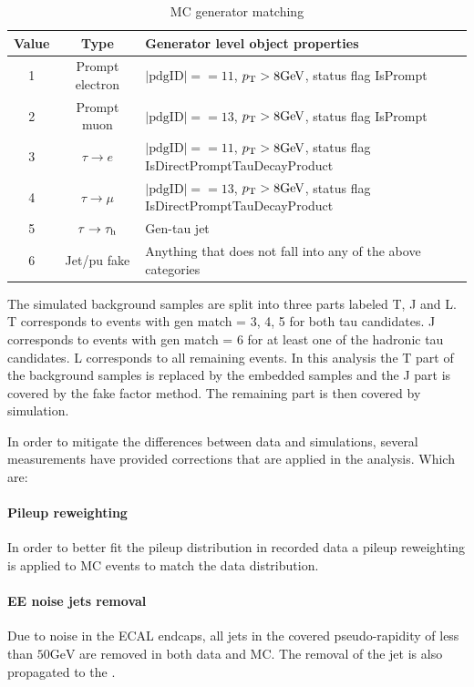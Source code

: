 \begin{table}[]
    \centering
    \begin{tabular}{|c|c|l|}
        \hline
        Value & Type & Generator level object properties \\
        \hline
        1 & Prompt electron & $|\mathrm{pdgID}|==11$, $p_{\mathrm{T}} > 8 \mathrm{GeV}$, status flag IsPrompt\\
        \hline
        2 & Prompt muon & $|\mathrm{pdgID}|==13$, $p_{\mathrm{T}} > 8 \mathrm{GeV}$, status flag IsPrompt\\
        \hline
        3 & $\tau \rightarrow e$ & $|\mathrm{pdgID}|==11$, $p_{\mathrm{T}} > 8 \mathrm{GeV}$, status flag IsDirectPromptTauDecayProduct\\
        \hline
        4 & $\tau \rightarrow \mu$ & $|\mathrm{pdgID}|==13$, $p_{\mathrm{T}} > 8 \mathrm{GeV}$, status flag IsDirectPromptTauDecayProduct\\
        \hline
        5 & $\tau \rightarrow \tau_{\rm h}$ & Gen-tau jet \\
        \hline
        6 & Jet/pu fake & Anything that does not fall into any of the above categories \\
        \hline
    \end{tabular}
    \caption{MC generator matching}
    \label{tab:mc_matching}
\end{table}

The simulated background samples are split into three parts labeled T, J and L. T corresponds to events with gen match = 3, 4, 5 for both tau candidates. J corresponds to events with gen match = 6 for at least one of the hadronic tau candidates. L corresponds to all remaining events. In this analysis the T part of the background samples is replaced by the embedded samples and the J part is covered by the fake factor method. The remaining part is then covered by simulation.

In order to mitigate the differences between data and simulations, several measurements have provided corrections that are applied in the analysis. Which are:

\paragraph{Pileup reweighting} In order to better fit the pileup distribution in recorded data a pileup reweighting is applied to MC events to match the data distribution.

\paragraph{EE noise jets removal} Due to noise in the ECAL endcaps, all jets in the covered pseudo-rapidity of less than $50 \mathrm{GeV}$ are removed in both data and MC. The removal of the jet is also propagated to the \MET.

